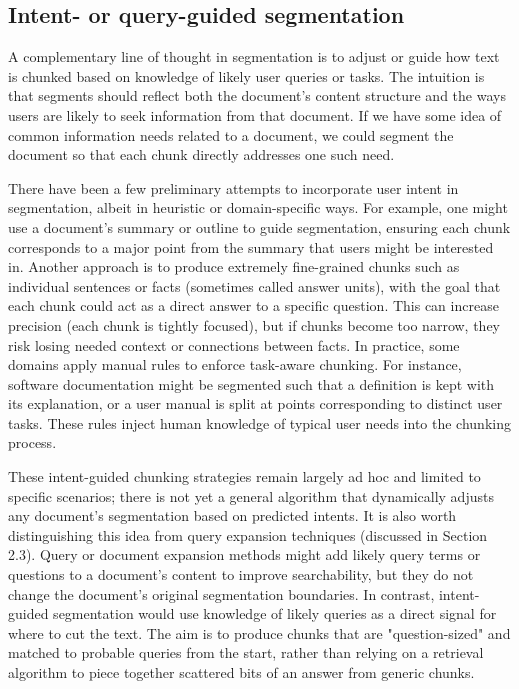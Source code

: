 \documentclass[12pt,a4paper]{report}
\begin{document}
\subsection{Intent- or query-guided segmentation}

A complementary line of thought in segmentation is to adjust or guide how text is chunked based on knowledge of likely user queries or tasks. The intuition is that segments should reflect both the document's content structure and the ways users are likely to seek information from that document. If we have some idea of common information needs related to a document, we could segment the document so that each chunk directly addresses one such need.

There have been a few preliminary attempts to incorporate user intent in segmentation, albeit in heuristic or domain-specific ways. For example, one might use a document's summary or outline to guide segmentation, ensuring each chunk corresponds to a major point from the summary that users might be interested in. Another approach is to produce extremely fine-grained chunks such as individual sentences or facts (sometimes called answer units), with the goal that each chunk could act as a direct answer to a specific question. This can increase precision (each chunk is tightly focused), but if chunks become too narrow, they risk losing needed context or connections between facts. In practice, some domains apply manual rules to enforce task-aware chunking. For instance, software documentation might be segmented such that a definition is kept with its explanation, or a user manual is split at points corresponding to distinct user tasks. These rules inject human knowledge of typical user needs into the chunking process.

These intent-guided chunking strategies remain largely ad hoc and limited to specific scenarios; there is not yet a general algorithm that dynamically adjusts any document's segmentation based on predicted intents. It is also worth distinguishing this idea from query expansion techniques (discussed in Section 2.3). Query or document expansion methods might add likely query terms or questions to a document's content to improve searchability, but they do not change the document's original segmentation boundaries. In contrast, intent-guided segmentation would use knowledge of likely queries as a direct signal for where to cut the text. The aim is to produce chunks that are "question-sized" and matched to probable queries from the start, rather than relying on a retrieval algorithm to piece together scattered bits of an answer from generic chunks.
\end{document}

